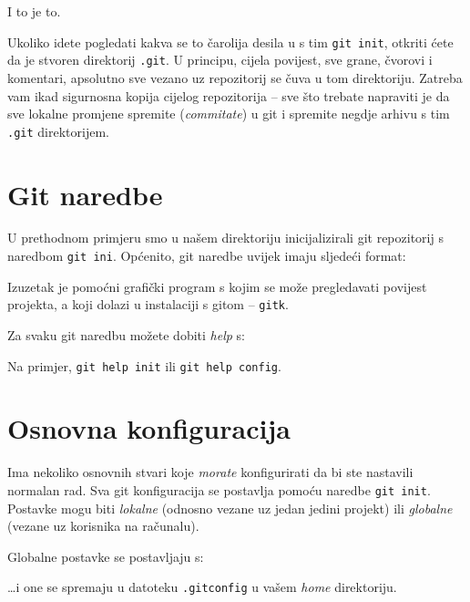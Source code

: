 

I to je to. 

Ukoliko idete pogledati kakva se to čarolija desila u s tim \verb+git init+, otkriti ćete da je stvoren direktorij \verb+.git+.
U principu, cijela povijest, sve grane, čvorovi i komentari, apsolutno sve vezano uz repozitorij se čuva u tom direktoriju.
Zatreba vam ikad sigurnosna kopija cijelog repozitorija -- sve što trebate napraviti je da sve lokalne promjene spremite (\emph{commitate}) u git i spremite negdje arhivu s tim \verb+.git+ direktorijem.

\section*{Git naredbe}

U prethodnom primjeru smo u našem direktoriju inicijalizirali git repozitorij s naredbom \verb+git ini+.
Općenito, git naredbe uvijek imaju sljedeći format:

\gitoutput{
\color{blue}{git $<$komanda$>$ $<$opcija1$>$ $<$opcija2$>$ \dots}
}

Izuzetak je pomoćni grafički program s kojim se može pregledavati povijest projekta, a koji dolazi u instalaciji s gitom -- \verb+gitk+.

Za svaku git naredbu možete dobiti \emph{help} s:


Na primjer, \verb+git help init+ ili \verb+git help config+.

\section*{Osnovna konfiguracija}

Ima nekoliko osnovnih stvari koje \emph{morate} konfigurirati da bi ste nastavili normalan rad. 
Sva git konfiguracija se postavlja pomoću naredbe \verb+git init+. 
Postavke mogu biti \emph{lokalne} (odnosno vezane uz jedan jedini projekt) ili \emph{globalne} (vezane uz korisnika na računalu).

Globalne postavke se postavljaju s:


\dots{}i one se spremaju u datoteku \verb+.gitconfig+ u vašem \emph{home} direktoriju.

